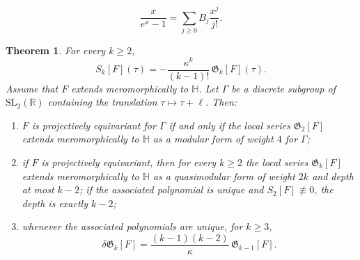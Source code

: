 \documentclass[10pt,a4paper]{amsart}
\newtheorem{thm}{Theorem}
\begin{document}
\begin{equation}\label{eq:Bernoulli}
\frac{x}{e^x-1}=\sum_{j\geq0}B_j\frac{x^j}{j!}.
\end{equation}

\begin{thm}\label{thm:Grunsky-quasimodular}
For every $k\geq2$,
\begin{equation}\label{eq:moment-Schwarzian}
S_k[F](\tau)
=
-\frac{\kappa^k}{(k-1)!}\,\mathfrak G_k[F](\tau).
\end{equation}
Assume that $F$ extends meromorphically to $\mathbb H$. Let $\Gamma$ be a discrete subgroup of $\mathrm{SL}_2(\mathbb R)$ containing the translation $\tau\mapsto\tau+\ell$. Then:
\begin{enumerate}
\item $F$ is projectively equivariant for $\Gamma$ if and only if the local series $\mathfrak G_2[F]$ extends meromorphically to $\mathbb H$ as a modular form of weight $4$ for $\Gamma$;
\item if $F$ is projectively equivariant, then for every $k\geq2$ the local series $\mathfrak G_k[F]$ extends meromorphically to $\mathbb H$ as a quasimodular form of weight $2k$ and depth at most $k-2$; if the associated polynomial is unique and $S_2[F]\not\equiv0$, the depth is exactly $k-2$;
\item whenever the associated polynomials are unique, for $k\geq3$,
\begin{equation}\label{eq:Grunsky-lowering}
\delta\mathfrak G_k[F]
=
\frac{(k-1)(k-2)}{\kappa}\,\mathfrak G_{k-1}[F].
\end{equation}
\end{enumerate}
\end{thm}
\end{document}
